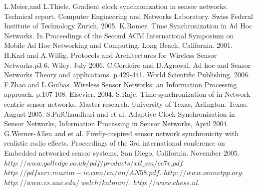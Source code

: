 \documentclass[a4paper,10pt]{report}
\begin{document}
\begin{thebibliography}{\textbf{References}}
L.Meier,and L.Thiele. Gradient clock synchronization in sensor networks. Technical report, Computer Engineering and Networks Laboratory. Swiss Federal Institute of Technology Zurich, 2005.
K.Romer. Time Synchronization in Ad Hoc Networks. In Proceedings of the Second ACM International Symposium on Mobile Ad Hoc Networking and Computing, Long Beach, California. 2001.
H.Karl and A.Willig. Protocols and Architectures for Wireless Sensor Networks.p3-6. Wiley. July 2006.
C.Cordeiro and D.Agrawal. Ad hoc and Sensor Networks Theory and applications. p.429-441. World Scientific Publishing. 2006.
F.Zhao and  L.Guibas. Wireless Sensor Networks: an Information Processing approach. p.107-108. Elsevier. 2004.
 S.Raje. Time synchronization of in Network-centric sensor networks. Master research. University of Texas, Arlington. Texas. August 2005.
S.PalChaudhuri and et al. Adaptive Clock Synchronization in Sensor Networks, Information Processing in Sensor Networks, April 2004.
G.Werner-Allen and et al. Firefly-inspired sensor network synchronicity with realistic radio effects. Proceedings of the 3rd international conference on Embedded networked sensor systems, San Diego, California. November 2005.
 $http://www.golledge.co.uk/pdf/products/xtl\_sm/cc7v.pdf$
 $http://pdfserv.maxim-ic.com/en/an/AN58.pdf$.
$http://www.omnetpp.org$.
$http://www.cs.unc.edu/~welch/kalman/$.
$http://www.chess.nl$.
\end{thebibliography}
\end{document}
